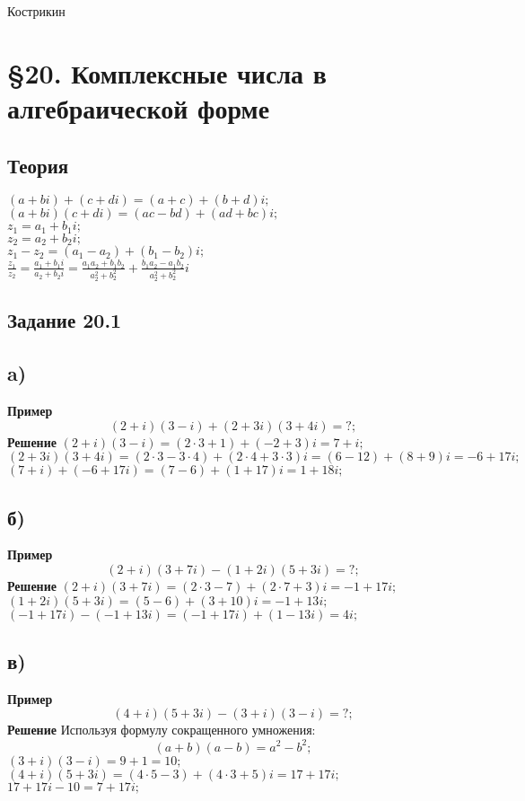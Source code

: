 \documentclass[12pt]{article}
\begin{document}
\begin{titlepage}

\huge Кострикин

\end{titlepage}
\tableofcontents
\newpage
\section{\S 20. Комплексные числа в алгебраической форме}
\subsection{Теория}
$ (a+bi) + (c+di) = (a+c)+(b+d)i; $ \\
$ (a+bi)(c+di) = (ac-bd)+(ad+bc)i; $\\
$ z_1 = a_1+b_1i;$\\
$ z_2 = a_2+b_2i;$\\
$ z_1 - z_2 = (a_1-a_2)+(b_1-b_2)i; $\\
$
\displaystyle
\frac{z_1}{z_2}=
\frac{a_1+b_1i}{a_2+b_2i}=
\frac{a_1 a_2 + b_1 b_2}{a_2^2+b_2^2}+
\frac{b_1 a_2 - a_1 b_2}{a_2^2+b_2^2}i
$
\subsection{Задание 20.1}
\subsection{a)}
\textbf{Пример}
$$(2+i)(3-i)+(2+3i)(3+4i) = ?;$$
\textbf{Решение}
$(2+i)(3-i)=(2\cdot3+1)+(-2+3)i = 7+i;$\\
$(2+3i)(3+4i) =(2\cdot3-3\cdot4)+( 2\cdot 4+3\cdot3)i=(6-12)+(8+9)i=-6+17i;$\\
$(7+i)+(-6+17i)=(7-6)+(1+17)i=1+18i;$

\newpage
\subsection{б)}
\textbf{Пример}
$$(2+i)(3+7i)-(1+2i)(5+3i) = ?;$$
\textbf{Решение}
$(2+i)(3+7i) = (2\cdot3-7)+(2\cdot7+3)i=-1+17i;$\\
$(1+2i)(5+3i) =(5-6)+(3+10)i = -1+13i;$\\
$(-1+17i)-(-1+13i)=(-1+17i)+(1-13i)=4i;$

\newpage
\subsection{в)}
\textbf{Пример}
$$(4+i)(5+3i)-(3+i)(3-i) = ?;$$
\textbf{Решение}
Используя формулу сокращенного умножения:
$$(a+b)(a-b)=a^2-b^2;$$
$(3+i)(3-i) = 9 + 1 = 10;$\\
$(4+i)(5+3i)= (4\cdot5 - 3)+(4\cdot3+5)i=17+17i;$\\
$17+17i-10=7+17i;$
\end{document}
